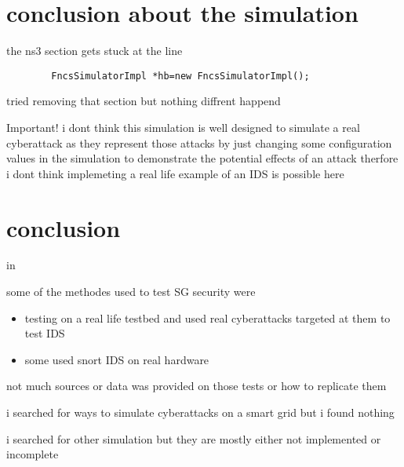 \documentclass{masterthesis-uc2-en}
\begin{document}
	\begin{lstlisting}
	\end{lstlisting}



	\section{conclusion about the simulation}

	the ns3 section gets stuck at the line     
	\begin{lstlisting}
		FncsSimulatorImpl *hb=new FncsSimulatorImpl();
	\end{lstlisting}
	tried removing that section but nothing diffrent happend



	\begin{bclogo}[logo=\bcattention, couleurBarre=red, noborder=true, 
		couleur=LightSalmon]{Important!}
		i dont think this simulation is well designed to simulate a real cyberattack as they represent those attacks by just changing some configuration values in the simulation to demonstrate the potential effects of an attack therfore i dont think implemeting a real life example of an IDS is possible here
	\end{bclogo}
	




	\section{conclusion}
	in 

	some of the methodes used to test SG security were 
	\begin{itemize}
		\item testing on a real life testbed and used real cyberattacks targeted at them to test IDS
		\item some used snort IDS on real hardware
	\end{itemize}

	not much sources or data was provided on those tests or how to replicate them
	


	i searched for ways to simulate cyberattacks on a smart grid but i found nothing

	i searched for other simulation but they are mostly either not implemented or incomplete
\end{document}
